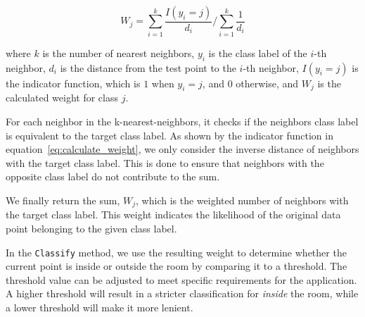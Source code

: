 \begin{equation}\label{eq:calculate_weight}
W_j = \sum_{i=1}^{k} \frac{I(y_i = j)}{d_i} \Bigg/ \sum_{i=1}^{k} \frac{1}{d_i}
\end{equation}

where $k$ is the number of nearest neighbors, $y_i$ is the class label of the $i$-th neighbor, $d_i$ is the distance from the test point to the $i$-th neighbor, $I(y_i=j)$ is the indicator function, which is $1$ when $y_i=j$, and $0$ otherwise, and $W_j$ is the calculated weight for class $j$.

For each neighbor in the k-nearest-neighbors, it checks if the neighbors class label is equivalent to the target class label. As shown by the indicator function in equation~\ref{eq:calculate_weight}, we only consider the inverse distance of neighbors with the target class label. This is done to ensure that neighbors with the opposite class label do not contribute to the sum.

We finally return the sum, $W_j$, which is the weighted number of neighbors with the target class label. This weight indicates the likelihood of the original data point belonging to the given class label.

In the \texttt{Classify} method, we use the resulting weight to determine whether the current point is inside or outside the room by comparing it to a threshold.
The threshold value can be adjusted to meet specific requirements for the application. A higher threshold will result in a stricter classification for \textit{inside} the room, while a lower threshold will make it more lenient.